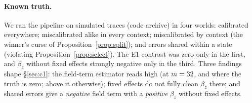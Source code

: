\paragraph{Known truth.}
We ran the pipeline on simulated traces (code archive) in four worlds: calibrated everywhere;
miscalibrated alike in every context; miscalibrated by context (the winner's curse of
Proposition~\ref{prop:split}); and errors shared within a state (violating
Proposition~\ref{prop:select}). The E1 contrast was zero only in the first, and $\beta_z$ without
fixed effects strongly negative only in the third. Three findings shape \S\ref{sec:c1}:
the field-term estimator reads high (at $m=32$, \TZeroFieldCalibrated{} and
\TZeroFieldUniform{} where the truth is zero; above it otherwise); fixed effects do
not fully clean $\beta_z$ there; and shared errors give a \emph{negative} field
term with a \emph{positive} $\beta_z$ without fixed effects.
